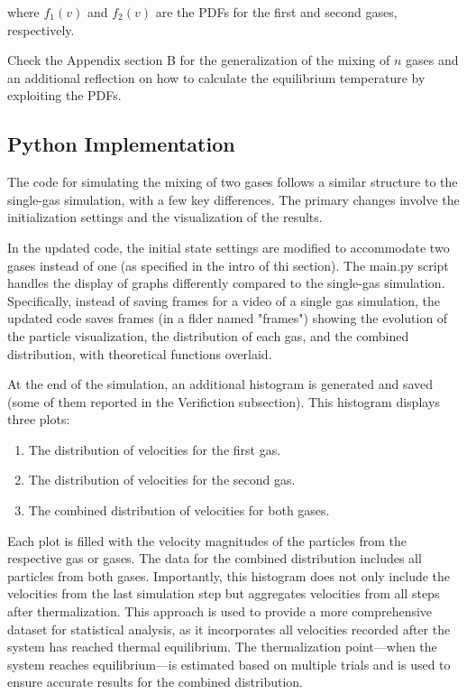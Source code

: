 \documentclass{article}
\begin{document}
where \( f_1(v) \) and \( f_2(v) \) are the PDFs for the first and second gases, respectively. 

Check the Appendix section B for the generalization of the mixing of \( n \) gases and an additional reflection on how to calculate the equilibrium temperature by exploiting the PDFs.

\subsection{Python Implementation}
The code for simulating the mixing of two gases follows a similar structure to the single-gas simulation, with a few key differences. The primary changes involve the initialization settings and the visualization of the results.

In the updated code, the initial state settings are modified to accommodate two gases instead of one (as specified in the intro of thi section). The main.py script handles the display of graphs differently compared to the single-gas simulation. Specifically, instead of saving frames for a video of a single gas simulation, the updated code saves frames (in a flder named "frames") showing the evolution of the particle visualization, the distribution of each gas, and the combined distribution, with theoretical functions overlaid.

At the end of the simulation, an additional histogram is generated and saved (some of them reported in the Verifiction subsection). This histogram displays three plots:
\begin{enumerate}
    \item The distribution of velocities for the first gas.
    \item The distribution of velocities for the second gas.
    \item The combined distribution of velocities for both gases.
\end{enumerate}
Each plot is filled with the velocity magnitudes of the particles from the respective gas or gases. The data for the combined distribution includes all particles from both gases. Importantly, this histogram does not only include the velocities from the last simulation step but aggregates velocities from all steps after thermalization. This approach is used to provide a more comprehensive dataset for statistical analysis, as it incorporates all velocities recorded after the system has reached thermal equilibrium. The thermalization point—when the system reaches equilibrium—is estimated based on multiple trials and is used to ensure accurate results for the combined distribution.
\end{document}
